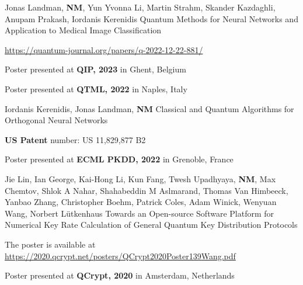 \begin{cventries}
  \cventry
    {Jonas Landman, \textbf{NM}, Yun Yvonna Li, Martin Strahm, Skander Kazdaghli, Anupam Prakash, Iordanis Kerenidis} %
    {Quantum Methods for Neural Networks and Application to Medical Image Classification} %
    {} %
    {}
    {
      \begin{cvitems} %
        \item {\href{https://quantum-journal.org/papers/q-2022-12-22-881/}{https://quantum-journal.org/papers/q-2022-12-22-881/}}
        \item {Poster presented at \textbf{QIP, 2023} in Ghent, Belgium}
        \item {Poster presented at \textbf{QTML, 2022} in Naples, Italy}
      \end{cvitems}
    }


  \cventry
    {Iordanis Kerenidis, Jonas Landman, \textbf{NM}} %
    {Classical and Quantum Algorithms for Orthogonal Neural Networks} %
    {} %
    {}
    {
      \begin{cvitems} %
        \item {\textbf{US Patent} number: US 11,829,877 B2}
        \item {Poster presented at \textbf{ECML PKDD, 2022} in Grenoble, France}
      \end{cvitems}
    }


  \cventry
    {Jie Lin, Ian George, Kai-Hong Li, Kun Fang, Twesh Upadhyaya, \textbf{NM}, Max Chemtov, Shlok A Nahar, Shahabeddin M Aslmarand, Thomas Van Himbeeck, Yanbao Zhang, Christopher Boehm, Patrick Coles, Adam Winick, Wenyuan Wang, Norbert Lütkenhaus} %
    {Towards an Open-source Software Platform for Numerical Key Rate Calculation of General Quantum Key Distribution Protocols} %
    {} %
    {}
    {
      \begin{cvitems} %
        \item {The poster is available at \href{https://2020.qcrypt.net/posters/QCrypt2020Poster139Wang.pdf}{https://2020.qcrypt.net/posters/QCrypt2020Poster139Wang.pdf}}
        \item {Poster presented at \textbf{QCrypt, 2020} in Amsterdam, Netherlands}
      \end{cvitems}
    }


\end{cventries}
